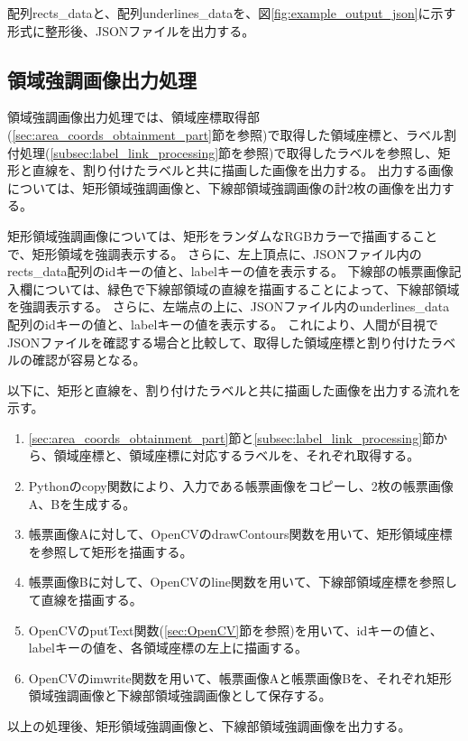 配列rects\_dataと、配列underlines\_dataを、図\ref{fig:example_output_json}に示す形式に整形後、JSONファイルを出力する。

\subsection{領域強調画像出力処理}\label{subsec:area_highlighted_image_output_processing}
領域強調画像出力処理では、領域座標取得部(\ref{sec:area_coords_obtainment_part}節を参照)で取得した領域座標と、ラベル割付処理(\ref{subsec:label_link_processing}節を参照)で取得したラベルを参照し、矩形と直線を、割り付けたラベルと共に描画した画像を出力する。
出力する画像については、矩形領域強調画像と、下線部領域強調画像の計2枚の画像を出力する。

矩形領域強調画像については、矩形をランダムなRGBカラーで描画することで、矩形領域を強調表示する。
さらに、左上頂点に、JSONファイル内のrects\_data配列のidキーの値と、labelキーの値を表示する。
下線部の帳票画像記入欄については、緑色で下線部領域の直線を描画することによって、下線部領域を強調表示する。
さらに、左端点の上に、JSONファイル内のunderlines\_data配列のidキーの値と、labelキーの値を表示する。
これにより、人間が目視でJSONファイルを確認する場合と比較して、取得した領域座標と割り付けたラベルの確認が容易となる。

以下に、矩形と直線を、割り付けたラベルと共に描画した画像を出力する流れを示す。

\begin{enumerate}
    \item \ref{sec:area_coords_obtainment_part}節と\ref{subsec:label_link_processing}節から、領域座標と、領域座標に対応するラベルを、それぞれ取得する。
    \item Pythonのcopy関数により、入力である帳票画像をコピーし、2枚の帳票画像A、Bを生成する。
    \item 帳票画像Aに対して、OpenCVのdrawContours関数を用いて、矩形領域座標を参照して矩形を描画する。
    \item 帳票画像Bに対して、OpenCVのline関数を用いて、下線部領域座標を参照して直線を描画する。
    \item OpenCVのputText関数(\ref{sec:OpenCV}節を参照)を用いて、idキーの値と、labelキーの値を、各領域座標の左上に描画する。
    \item OpenCVのimwrite関数を用いて、帳票画像Aと帳票画像Bを、それぞれ矩形領域強調画像と下線部領域強調画像として保存する。
\end{enumerate}

以上の処理後、矩形領域強調画像と、下線部領域強調画像を出力する。